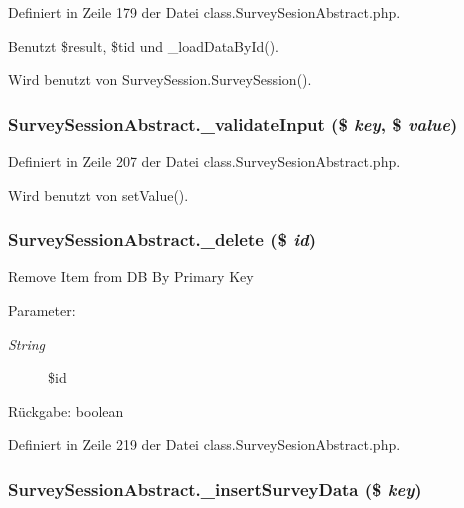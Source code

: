 Definiert in Zeile 179 der Datei class.SurveySesionAbstract.php.

Benutzt \$result, \$tid und \_\-loadDataById().

Wird benutzt von SurveySession.SurveySession().
\subsubsection{\setlength{\rightskip}{0pt plus 5cm}SurveySessionAbstract.\_\-validateInput (\$ {\em key}, \$ {\em value})}\label{classSurveySessionAbstract_8d0cadd5f91d6f46b3d022c280b261d2}




Definiert in Zeile 207 der Datei class.SurveySesionAbstract.php.

Wird benutzt von setValue().
\subsubsection{\setlength{\rightskip}{0pt plus 5cm}SurveySessionAbstract.\_\-delete (\$ {\em id})}\label{classSurveySessionAbstract_ec7cc35193fd2fc5d80fd839b671aad6}


Remove Item from DB By Primary Key

\begin{Desc}
\item[Parameter:]
\begin{description}
\item[{\em String}]\$id \end{description}
\end{Desc}
\begin{Desc}
\item[Rückgabe:]boolean \end{Desc}


Definiert in Zeile 219 der Datei class.SurveySesionAbstract.php.
\subsubsection{\setlength{\rightskip}{0pt plus 5cm}SurveySessionAbstract.\_\-insertSurveyData (\$ {\em key})}\label{classSurveySessionAbstract_46f64bb4438cc854cc6c133bd83a0f10}


